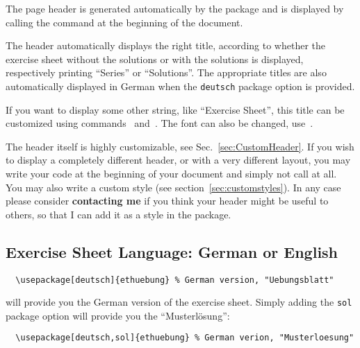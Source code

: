 \documentclass[11pt,a4paper]{article}
\begin{document}
The page header is generated automatically by the package and is displayed by calling the
 command at the beginning of the document.


The header automatically displays the right title, according to whether the exercise sheet
without the solutions or with the solutions is displayed, respectively printing ``Series''
or ``Solutions''. The appropriate titles are also automatically displayed in German when
the \texttt{deutsch} package option is provided.

\begin{pkgtip}
  If you want to display some other string,
  like ``Exercise Sheet'', this title can be customized using
  commands~ and~. The
  font can also be changed, use~.
\end{pkgtip}

\begin{pkgtip}
  The header itself is highly customizable, see Sec.~\ref{sec:CustomHeader}. If you wish
  to display a completely different header, or with a very different layout, you may write
  your code at the beginning of your document and simply not call
   at all. You may also write a custom style (see
  section~\ref{sec:customstyles}). In any case please consider \textbf{contacting me} if
  you think your header might be useful to others, so that I can add it as a style in the
  package.
\end{pkgtip}


\subsection{Exercise Sheet Language: German or English}
\label{sec:Language}

\begin{pkgverbatim}
\begin{verbatim}
  \usepackage[deutsch]{ethuebung} % German version, "Uebungsblatt"
\end{verbatim}
\end{pkgverbatim}
will provide you the German version of the exercise sheet. Simply adding the \texttt{sol}
package option will provide you the ``Musterl\"osung'':
\begin{pkgverbatim}
\begin{verbatim}
  \usepackage[deutsch,sol]{ethuebung} % German verion, "Musterloesung"
\end{verbatim}
\end{pkgverbatim}
\end{document}
